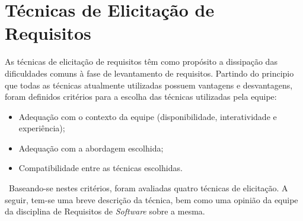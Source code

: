 	\section[Técnicas de Elicitação de Requisitos]{Técnicas de Elicitação de Requisitos}
	\label{sec:elicitacao_tecnicas}
		As técnicas de elicitação de requisitos têm como propósito a dissipação das dificuldades comuns à fase de levantamento de requisitos. Partindo do principio que todas as técnicas atualmente utilizadas possuem vantagens e desvantagens, foram definidos critérios para a escolha das técnicas utilizadas pela equipe:
		\begin{itemize}
			\item{Adequação com o contexto da equipe (disponibilidade, interatividade e experiência);}
			\item{Adequação com a abordagem escolhida;}
			\item{Compatibilidade entre as técnicas escolhidas.}
		\end{itemize}
		\ \indent Baseando-se nestes critérios, foram avaliadas quatro técnicas de elicitação. A seguir, tem-se uma breve descrição da técnica, bem como uma opinião da equipe da disciplina de Requisitos de \emph{Software} sobre a mesma.
